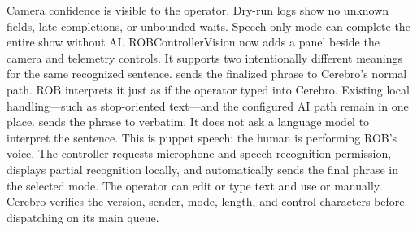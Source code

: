 \markdownRendererUlItem Camera confidence is visible to the operator.\markdownRendererUlItemEnd 
\markdownRendererUlItem Dry-run logs show no unknown fields, late completions, or unbounded waits.\markdownRendererUlItemEnd 
\markdownRendererUlItem Speech-only mode can complete the entire show without AI.\markdownRendererUlItemEnd 
\markdownRendererUlEnd \markdownRendererInterblockSeparator
{}\markdownRendererThematicBreak{}\markdownRendererInterblockSeparator
{}
\markdownRendererSectionEnd 
\markdownRendererSectionEnd \markdownRendererSectionBegin
{}\markdownRendererInterblockSeparator
{}ROBControllerVision now adds a  panel beside the\markdownRendererSoftLineBreak
{}camera and telemetry controls. It supports two intentionally different\markdownRendererSoftLineBreak
{}meanings for the same recognized sentence.\markdownRendererParagraphSeparator
{} sends the finalized phrase to Cerebro's normal  path.\markdownRendererSoftLineBreak
{}ROB interprets it just as if the operator typed into Cerebro. Existing local\markdownRendererSoftLineBreak
{}handling—such as stop-oriented text—and the configured AI path remain in one\markdownRendererSoftLineBreak
{}place.\markdownRendererParagraphSeparator
{} sends the phrase to  verbatim. It does not ask a\markdownRendererSoftLineBreak
{}language model to interpret the sentence. This is puppet speech: the human is\markdownRendererSoftLineBreak
{}performing ROB's voice.\markdownRendererInterblockSeparator
{}\markdownRendererInterblockSeparator
{}The controller requests microphone and speech-recognition permission, displays\markdownRendererSoftLineBreak
{}partial recognition locally, and automatically sends the final phrase in the\markdownRendererSoftLineBreak
{}selected mode. The operator can edit or type text and use  or\markdownRendererSoftLineBreak
{} manually. Cerebro verifies the version, sender, mode, length,\markdownRendererSoftLineBreak
{}and control characters before dispatching on its main queue.\markdownRendererInterblockSeparator
{}\markdownRendererSectionBegin
